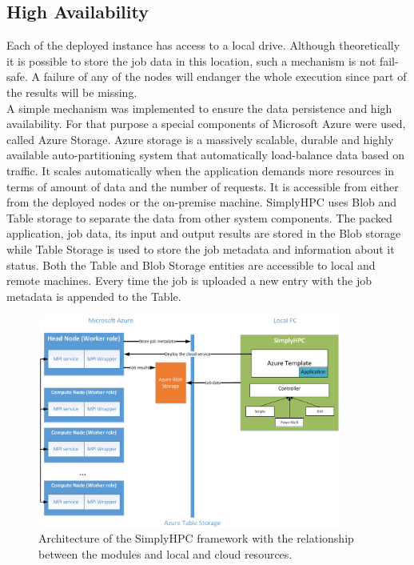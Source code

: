 \documentclass[3p,times]{elsarticle}
\begin{document}
\subsection{High Availability}
\label{sec:high_avilability}
Each of the deployed instance has access to a local drive. Although theoretically it is possible to store the job data in this location, such a mechanism is not fail-safe. A failure of any of the nodes will endanger the whole execution since part of the results will be missing.\\
A simple mechanism was implemented to ensure the data persistence and high availability. For that purpose a special components of Microsoft Azure were used, called Azure Storage. Azure storage is a massively scalable, durable and highly available auto-partitioning system that automatically load-balance data based on traffic. It scales automatically when the application demands more resources in terms of amount of data and the number of requests. It is accessible from either from the deployed nodes or the on-premise machine. SimplyHPC uses Blob and Table storage to separate the data from other system components. The packed application, job data, its input and output results are stored in the Blob storage while Table Storage is used to store the job metadata and information about it status. Both the Table and Blob Storage entities are accessible to local and remote machines. Every time the job is uploaded a new entry with the job metadata is appended to the Table. %

\begin{figure}
\centering
  \includegraphics[width=10cm,height=7cm]{architecture.png}%
  \caption{Architecture of the SimplyHPC framework with the relationship between the modules and local and cloud resources.}
	\label{fig:architecture}
\end{figure}
\end{document}
